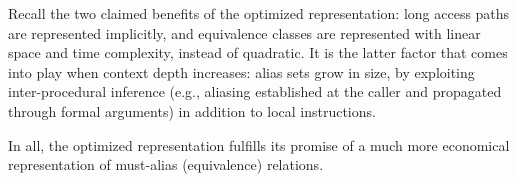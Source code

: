 
Recall the two claimed benefits of the optimized representation: long access paths
are represented implicitly, and equivalence classes are represented with linear
space and time complexity, instead of quadratic. It is the latter factor that
comes into play when context depth increases: alias sets grow in size, by exploiting
inter-procedural inference (e.g., aliasing established at the caller and
propagated through formal arguments) in addition to local instructions.

In all, the optimized representation fulfills its promise of a much more economical
representation of must-alias (equivalence) relations. 







